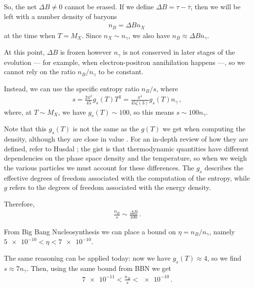 \documentclass[main.tex]{subfiles}
\begin{document}
So, the net \(\Delta B \neq 0\) cannot be erased. If we define \(\Delta B = \tau - \overline{\tau}\), then we will be left with a number density of baryons 
%
\begin{align}
n_B = \Delta B n_X
\,
\end{align}
%
at the time when \(T = M_X\). Since \(n_X \sim n_\gamma \), we also have \(n_B \approx \Delta B n_\gamma \).

At this point, \(\Delta B\) is frozen
however \(n_\gamma \) is not conserved in later stages of the evolution --- for example, when electron-positron annihilation happens ---, so we cannot rely on the ratio \(n_B / n_\gamma \) to be constant. 

Instead, we can use the specific entropy ratio \(n_B / s\), where \cite[eqs.\ 8.46 and 8.49]{bergstromCosmologyParticleAstrophysics2003}
%
\begin{align}
s = \frac{2 \pi^2}{45} g_s (T) T^3 
= \frac{\pi^{4}}{45 \zeta (3)} g_s (T) n_\gamma 
\,,
\end{align}
%
where, at \(T \sim M_X\), we have \(g_s (T) \sim 100\), so this means \(s \sim 100 n_\gamma \).

Note that this \(g_s(T)\) is not the same as the \(g(T)\) we get when computing the density, although they are close in value \cite[fig.\ 1]{husdalEffectiveDegreesFreedom2016}.
For an in-depth review of how they are defined, refer to Husdal \cite[sec.\ 4.5]{husdalEffectiveDegreesFreedom2016}; the gist is that thermodynamic quantities have different dependencies on the phase space density and the temperature, so when we weigh the various particles we must account for these differences. The \(g_s\) describes the effective degrees of freedom associated with the computation of the entropy, while \(g\) refers to the degrees of freedom associated with the energy density. 

Therefore, 
%
\begin{align}
\frac{n_B}{s} \sim \frac{\Delta B}{100}
\,.
\end{align}

From Big Bang Nucleosynthesis we can place a bound on \(\eta  = n_B / n_\gamma \), namely \(\num{5e-10} < \eta < \num{7e-10}\).

The same reasoning can be applied today: now we have \(g_s(T) \approx 4\), so we find \(s \approx 7 n_\gamma \).
Then, using the same bound from BBN we get 
%
\begin{align}
\num{7e-11} < 
\frac{n_B}{s}
< \num{e-10}
\,.
\end{align}
\end{document}
